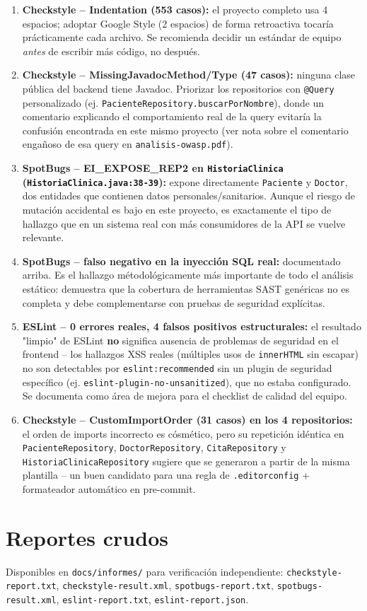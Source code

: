 \documentclass[11pt,a4paper]{article}
\begin{document}
\begin{enumerate}[leftmargin=*]
  \item \textbf{Checkstyle -- Indentation (553 casos):} el proyecto completo
    usa 4 espacios; adoptar Google Style (2 espacios) de forma retroactiva
    tocar\'ia pr\'acticamente cada archivo. Se recomienda decidir un est\'andar
    de equipo \emph{antes} de escribir m\'as c\'odigo, no despu\'es.
  \item \textbf{Checkstyle -- MissingJavadocMethod/Type (47 casos):} ninguna
    clase p\'ublica del backend tiene Javadoc. Priorizar los repositorios con
    \texttt{@Query} personalizado (ej.
    \texttt{PacienteRepository.buscarPorNombre}), donde un comentario
    explicando el comportamiento real de la query evitar\'ia la confusi\'on
    encontrada en este mismo proyecto (ver nota sobre el comentario enga\~noso
    de esa query en \texttt{analisis-owasp.pdf}).
  \item \textbf{SpotBugs -- EI\_EXPOSE\_REP2 en \texttt{HistoriaClinica}
    (\texttt{HistoriaClinica.java:38-39}):} expone directamente
    \texttt{Paciente} y \texttt{Doctor}, dos entidades que contienen datos
    personales/sanitarios. Aunque el riesgo de mutaci\'on accidental es bajo
    en este proyecto, es exactamente el tipo de hallazgo que en un sistema
    real con m\'as consumidores de la API se vuelve relevante.
  \item \textbf{SpotBugs -- falso negativo en la inyecci\'on SQL real:}
    documentado arriba. Es el hallazgo m\'etodol\'ogicamente m\'as importante
    de todo el an\'alisis est\'atico: demuestra que la cobertura de
    herramientas SAST gen\'ericas no es completa y debe complementarse con
    pruebas de seguridad expl\'icitas.
  \item \textbf{ESLint -- 0 errores reales, 4 falsos positivos
    estructurales:} el resultado "limpio" de ESLint \textbf{no} significa
    ausencia de problemas de seguridad en el frontend -- los hallazgos XSS
    reales (m\'ultiples usos de \texttt{innerHTML} sin escapar) no son
    detectables por \texttt{eslint:recommended} sin un plugin de seguridad
    espec\'ifico (ej. \texttt{eslint-plugin-no-unsanitized}), que no estaba
    configurado. Se documenta como \'area de mejora para el checklist de
    calidad del equipo.
  \item \textbf{Checkstyle -- CustomImportOrder (31 casos) en los 4
    repositorios:} el orden de imports incorrecto es c\'osm\'etico, pero su
    repetici\'on id\'entica en \texttt{PacienteRepository},
    \texttt{DoctorRepository}, \texttt{CitaRepository} y
    \texttt{HistoriaClinicaRepository} sugiere que se generaron a partir de
    la misma plantilla -- un buen candidato para una regla de
    \texttt{.editorconfig} + formateador autom\'atico en pre-commit.
\end{enumerate}

\section{Reportes crudos}

Disponibles en \texttt{docs/informes/} para verificaci\'on independiente:
\texttt{checkstyle-report.txt}, \texttt{checkstyle-result.xml},
\texttt{spotbugs-report.txt}, \texttt{spotbugs-result.xml},
\texttt{eslint-report.txt}, \texttt{eslint-report.json}.
\end{document}
